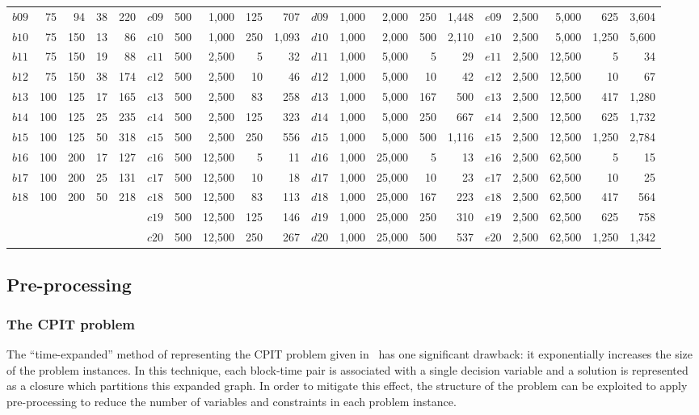 \documentclass[authoryear,11pt,square,number,times,super,comma]{elsarticle}
\begin{document}
\begin{table}[h]
\begin{adjustbox}{width=\textwidth}
\begin{tabular}{lrrrr|lrrrr|lrrrr|lrrrr}
$b09$ & 75 & 94 & 38 & 220& $c09$ & 500 & 1,000 & 125 & 707&  $d09$ & 1,000 & 2,000 & 250 & 1,448& $e09$ & 2,500 & 5,000 & 625 & 3,604\\
$b10$ & 75 & 150 & 13 & 86& $c10$ & 500 & 1,000 & 250 &1,093&  $d10$ & 1,000 & 2,000 & 500 & 2,110& $e10$ & 2,500 & 5,000 & 1,250 &5,600\\
$b11$ & 75 & 150 & 19 & 88& $c11$ & 500 & 2,500 & 5 &32&  $d11$ & 1,000 & 5,000 & 5 & 29& $e11$ & 2,500 & 12,500 & 5 &34\\
$b12$ & 75 & 150 & 38 & 174& $c12$ & 500 & 2,500 & 10 & 46&  $d12$ & 1,000 & 5,000 & 10 & 42& $e12$ & 2,500 & 12,500 & 10 & 67\\
$b13$ & 100 & 125 & 17 & 165& $c13$ & 500 & 2,500 & 83 & 258&  $d13$ & 1,000 & 5,000 & 167 & 500& $e13$ & 2,500 & 12,500 & 417 & 1,280\\
$b14$ & 100 & 125 & 25 & 235& $c14$ & 500 & 2,500 & 125 & 323&  $d14$ & 1,000 & 5,000 & 250 & 667& $e14$ & 2,500 & 12,500 & 625 & 1,732\\
$b15$ & 100 & 125 & 50 & 318& $c15$ & 500 & 2,500 & 250 & 556&  $d15$ & 1,000 & 5,000 & 500 & 1,116& $e15$ & 2,500 & 12,500 & 1,250 & 2,784\\
$b16$ & 100 & 200 & 17 & 127& $c16$ & 500 & 12,500 & 5 & 11&  $d16$ & 1,000 & 25,000 & 5 & 13& $e16$ & 2,500 & 62,500 & 5 & 15\\
$b17$ & 100 & 200 & 25 & 131& $c17$ & 500 & 12,500 & 10 & 18&  $d17$ & 1,000 & 25,000 & 10 & 23& $e17$ & 2,500 & 62,500 & 10 & 25\\
$b18$ & 100 & 200 & 50 & 218& $c18$ & 500 & 12,500 & 83 & 113&  $d18$ & 1,000 & 25,000 & 167 & 223& $e18$ & 2,500 & 62,500 & 417 & 564\\
&&&&& $c19$ & 500 & 12,500 & 125 & 146 &$d19$ & 1,000 & 25,000 & 250 & 310& $e19$ & 2,500 & 62,500 & 625 & 758\\
&&&&& $c20$ & 500 & 12,500 & 250 & 267 &$d20$ & 1,000 & 25,000 & 500 & 537& $e20$ & 2,500 & 62,500 & 1,250 & 1,342\\
\bottomrule
\end{tabular}
\end{adjustbox}
\end{table}

\subsection{Pre-processing}
\subsubsection*{The CPIT problem}
The ``time-expanded'' method of representing the CPIT problem given in~\cite{Kenny:2017} has one significant drawback: it exponentially increases the size of the problem instances. In this technique, each block-time pair is associated with a single decision variable and a solution is represented as a closure which partitions this expanded graph. In order to mitigate this effect, the structure of the problem can be exploited to apply pre-processing to reduce the number of variables and constraints in each problem instance.
\end{document}
